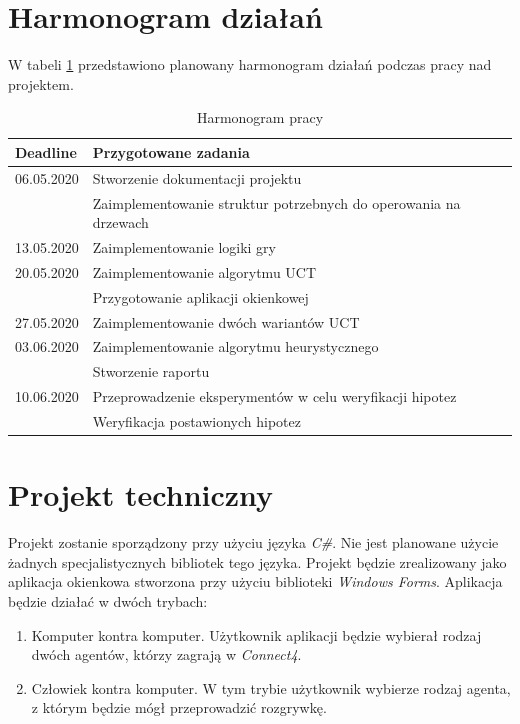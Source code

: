 \documentclass[a4paper,12pt]{article}
\let\oldsection\section
\renewcommand\section{\clearpage\oldsection}
\newcommand{\nazwagry}{\textit{Connect4}}
\begin{document}
\section{Harmonogram działań}
W tabeli \ref{tab:schedule} przedstawiono planowany harmonogram działań podczas pracy nad projektem.

\begin{table}[h!]
	\centering
	\caption{Harmonogram pracy}
	\label{tab:schedule}
	\smallskip
	\begin{tabular}{|l|l|}
		\hline
		\textbf{Deadline}   & \textbf{Przygotowane zadania} \\ \hline
		
		06.05.2020 	& Stworzenie dokumentacji projektu \\ 
		& Zaimplementowanie struktur potrzebnych do operowania na drzewach \\ \hline
		
		13.05.2020  & Zaimplementowanie logiki gry \\ \hline
		
		20.05.2020	& Zaimplementowanie algorytmu UCT \\
		& Przygotowanie aplikacji okienkowej \\ \hline
		
		27.05.2020	&  Zaimplementowanie dwóch wariantów UCT \\ \hline
		
		03.06.2020	& Zaimplementowanie algorytmu heurystycznego \\ 
		& Stworzenie raportu \\ \hline
		
		10.06.2020	& Przeprowadzenie eksperymentów w celu weryfikacji hipotez \\ 
		&  Weryfikacja postawionych hipotez \\ \hline
	\end{tabular}
\end{table}


\section{Projekt techniczny}
Projekt zostanie sporządzony przy użyciu języka \textit{C\#}. Nie jest planowane użycie żadnych specjalistycznych bibliotek tego języka. Projekt będzie zrealizowany jako aplikacja okienkowa stworzona przy użyciu biblioteki \textit{Windows Forms}. Aplikacja będzie działać w dwóch trybach:

\begin{enumerate}
	\item Komputer kontra komputer. Użytkownik aplikacji będzie wybierał rodzaj dwóch agentów, którzy zagrają w \nazwagry.
	\item Człowiek kontra komputer. W tym trybie użytkownik wybierze rodzaj agenta, z którym będzie mógł przeprowadzić rozgrywkę.\\
\end{enumerate}
\end{document}
